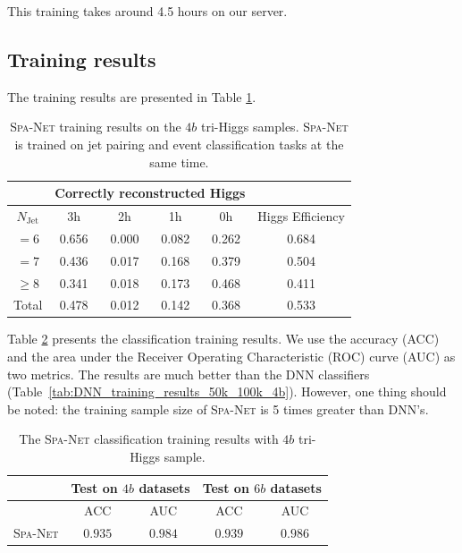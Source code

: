\documentclass[12pt]{article}
\begin{document}
        This training takes around 4.5 hours on our server.
    \subsection{Training results}%
    \label{sub:training_results_spanet_classifier}
        The training results are presented in Table \ref{tab:SPANet_triHiggs_4b_cls_pairing_results}.

        \begin{table}[htpb]
            \centering
            \caption{\textsc{Spa-Net} training results on the $4b$ tri-Higgs samples. \textsc{Spa-Net} is trained on jet pairing and event classification tasks at the same time.}
            \label{tab:SPANet_triHiggs_4b_cls_pairing_results}
            \begin{tabular}{c|cccc|c}
                           & \multicolumn{4}{c|}{Correctly reconstructed Higgs} &                  \\ \hline
            $N_\text{Jet}$ & 3h          & 2h         & 1h         & 0h         & Higgs Efficiency \\ \hline
            $=6$           & 0.656       & 0.000      & 0.082      & 0.262      & 0.684            \\
            $=7$           & 0.436       & 0.017      & 0.168      & 0.379      & 0.504            \\
            $\ge 8$        & 0.341       & 0.018      & 0.173      & 0.468      & 0.411            \\ \hline
            Total          & 0.478       & 0.012      & 0.142      & 0.368      & 0.533
            \end{tabular}
        \end{table}

        Table \ref{tab:SPANet_triHiggs_4b_cls_classification_results} presents the classification training results. We use the accuracy (ACC) and the area under the Receiver Operating Characteristic (ROC) curve (AUC) as two metrics. The results are much better than the DNN classifiers (Table~\ref{tab:DNN_training_results_50k_100k_4b}). However, one thing should be noted: the training sample size of \textsc{Spa-Net} is 5 times greater than DNN's.
        \begin{table}[htpb]
            \centering
            \caption{The \textsc{Spa-Net} classification training results with $4b$ tri-Higgs sample.}
            \label{tab:SPANet_triHiggs_4b_cls_classification_results}
            \begin{tabular}{c|cc|cc}
                             & \multicolumn{2}{c|}{Test on $4b$ datasets}& \multicolumn{2}{c}{Test on $6b$ datasets} \\ \hline
                             & ACC                 & AUC                 & ACC                 & AUC                 \\ \hline
            \textsc{Spa-Net} & $0.935$             & $0.984$             & $0.939$             & $0.986$
            \end{tabular}
        \end{table}
\end{document}
